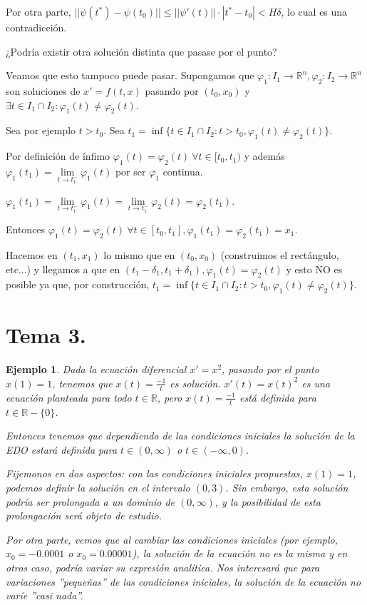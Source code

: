\documentclass[11pt]{article}
\makeatletter
\theoremstyle{theorem-style}  %
\renewenvironment{proof}[1][\proofname]{\par
	\pushQED{\qed}%
	\normalfont \topsep6\p@\@plus6\p@\relax
	\list{}{%
		\settowidth{\leftmargin}{\quad:\hskip\labelsep}%
		\setlength{\labelwidth}{0pt}%
		\setlength{\itemindent}{-\leftmargin}%
	}%
	\item[\hskip\labelsep\itshape#1\@addpunct{:}]\ignorespaces
}{%
	\popQED\endlist\@endpefalse
}
\theoremstyle{definition-style}
\theoremstyle{example-style}
\newtheorem{example}{Ejemplo}[section]
\makeatother
\begin{document}
\begin{proof}
\begin{adjustwidth}{1cm}{}
		Por otra parte, $ ||\psi(t^*)-\psi(t_0)||\leq ||\psi'(t)||\cdot |t^*-t_0|<H\delta $, lo cual es una contradicción.
	\end{adjustwidth}
	
	¿Podría existir otra solución distinta que pasase por el punto?
	\begin{adjustwidth}{1cm}{}
		Veamos que esto tampoco puede pasar. Supongamos que $ \varphi_1: I_1\longrightarrow\mathbb{R}^n, \varphi_2:I_2 \longrightarrow \mathbb{R}^n $ son soluciones de $ x'=f(t,x) $ pasando por $ (t_0,x_0) $ y $ \exists t\in I_1\cap I_2 : \varphi_1(t)\neq \varphi_2(t) $.
		
		Sea por ejemplo $ t>t_0 $. Sea $ t_1=\inf \{t \in I_1\cap I_2 :t>t_0, \varphi_1(t)\neq \varphi_2(t)  \} $.
		
		Por definición de ínfimo $ \varphi_1(t)=\varphi_2(t) \ \forall t \in [t_0, t_1) $ y además $ \varphi_1(t_1)=\lim\limits_{t\to t_1^-} \varphi_1(t) $ por ser $ \varphi_1 $ continua.
		
		$ \varphi_1(t_1)=\lim\limits_{t\to t_1^-} \varphi_1(t)=\lim\limits_{t\to t_1^-} \varphi_2(t)= \varphi_2(t_1) $.
		
		Entonces $ \varphi_1(t)=\varphi_2(t) \ \forall t \in [t_0,t_1], \varphi_1(t_1)=\varphi_2(t_1)=x_1 $.
		
		Hacemos en $ (t_1, x_1) $ lo mismo que en $ (t_0,x_0) $ (construimos el rectángulo, etc...) y llegamos a que en $ (t_1-\delta_1, t_1+\delta _1), \varphi_1(t)=\varphi_2(t) $ y esto NO es posible ya que, por construcción, $ t_1=\inf \{t\in I_1\cap I_2 : t>t_0, \varphi_1(t)\neq \varphi_2(t)\} $.
	\end{adjustwidth}
\end{proof}
\pagebreak
\section{Tema 3.}
\begin{example}
	Dada la ecuación diferencial $ x'=x^2 $, pasando por el punto $ x(1)=1 $, tenemos que $ x(t)=\frac{-1}{t} $ es solución. $ x'(t)=x(t)^2 $ es una ecuación planteada para todo $ t \in \mathbb{R} $, pero $ x(t)=\frac{-1}{t} $ está definida para $ t \in \mathbb{R}-\{0\} $.
	
	Entonces tenemos que dependiendo de las condiciones iniciales la solución de la EDO estará definida para $ t\in (0,\infty) $ o $ t\in (-\infty,0) $.
	
	Fijemonos en dos aspectos: con las condiciones iniciales propuestas, $ x(1)=1 $, podemos definir la solución en el intervalo $ (0,3) $. Sin embargo, esta solución podría ser prolongada a un dominio de $ (0,\infty) $, y la posibilidad de esta prolongación será objeto de estudio.
	
	Por otra parte, vemos que al cambiar las condiciones iniciales (por ejemplo, $ x_0=-0.0001 $ o $ x_0=0.00001 $), la solución de la ecuación no es la misma y en otros caso, podría variar su expresión analítica. Nos interesará que para variaciones ''pequeñas'' de las condiciones iniciales, la solución de la ecuación no varíe ''casi nada''.
\end{example}
\end{document}
